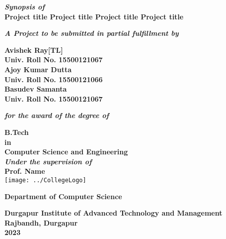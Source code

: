 \documentclass[12pt,a4paper,oneside]{report}
\begin{document}
	\thispagestyle{empty}
	\begin{center}
		{\textbf{\textit{Synopsis of}\\}}
		{\Large\bf{Project title Project title Project title Project title} \\}
		
		
		\vspace{0.3in}
		
		
		{\textbf{\textit  {A Project to be submitted in partial fulfillment by\\}}}
		
		
		
		\vspace{0.4in}
		{\large \bf Avishek Ray[TL]\\Univ. Roll No. 15500121067\\Ajoy Kumar Dutta\\Univ. Roll No. 15500121066\\ Basudev Samanta\\Univ. Roll No. 15500121067\\}
			
		
		\vspace{0.3 in}
		
		{\bf\textit{for the award of the degree of}}
		
		\vspace{0.3 in}
		
		
		{\Large{\bf B.Tech \\ in \\Computer Science and Engineering }\\}
		\vspace{0.3in}
		{\bf\textit{Under the supervision of\\ }}
		{\Large{\bf Prof. Name}\\}		    
		\vspace{0.3in}
		\texttt{[image: ../CollegeLogo]}
		
		
		{\large\bf Department of Computer Science\\}
		
		{\large\bf  Durgapur Institute of Advanced Technology and Management \\}
		{\large\bf Rajbandh, Durgapur \\}
		{\large\bf  2023 }
	\end{center}
	\date{}
	\setcounter{page}{0}
	
\end{document}
